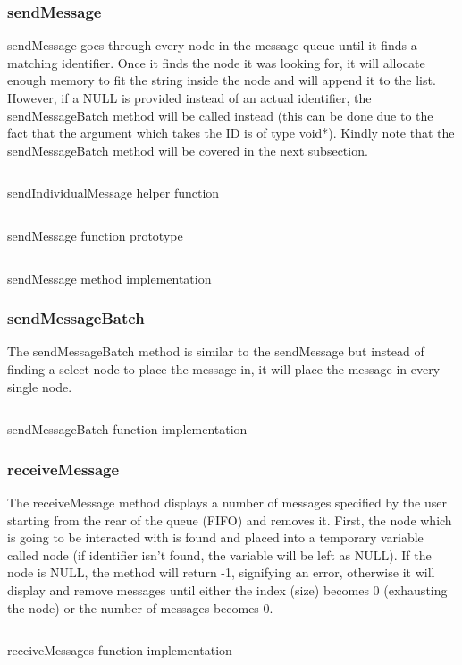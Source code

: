\documentclass[a4paper, 12pt, titlepage]{article}
\newenvironment{code}{\captionsetup{type=listing}}{}
\newcommand{\sourcecode}[3]{
    \begin{code}
      \inputminted[linenos,numbersep=5pt,gobble=0,frame=lines,framesep=2mm,]{c}{#1}
        \caption{#2}
        \label{lst: #3}
    \end{code}
}
\begin{document}
\begin{onehalfspacing}
  \subsubsection{sendMessage}
  sendMessage goes through every node in the message queue until it finds a matching identifier. Once it finds the node it was looking for, it will allocate enough memory to fit the string inside the node and will append it to the list. However, if a NULL is provided instead of an actual identifier, the sendMessageBatch method will be called instead (this can be done due to the fact that the argument which takes the ID is of type void*). Kindly note that the sendMessageBatch method will be covered in the next subsection.

    \sourcecode{snippets/sendIndividual.c}{sendIndividualMessage helper function}{sendInd}

  \sourcecode{snippets/sendMessage_header.c}{sendMessage function prototype}{sendMessage_header}

  \sourcecode{snippets/sendMessage.c}{sendMessage method implementation}{sendMessage}



  \subsubsection{sendMessageBatch}
  The sendMessageBatch method is similar to the sendMessage but instead of finding a select node to place the message in, it will place the message in every single node.

  \sourcecode{snippets/sendMessageBatch.c}{sendMessageBatch function implementation}{sendMessageBatch}


  \subsubsection{receiveMessage}
  The receiveMessage method displays a number of messages specified by the user starting from the rear of the queue (FIFO) and removes it. First, the node which is going to be interacted with is found and placed into a temporary variable called node (if identifier isn't found, the variable will be left as NULL). If the node is NULL, the method will return -1, signifying an error, otherwise it will display and remove messages until either the index (size) becomes 0 (exhausting the node) or the number of messages becomes 0.

  \sourcecode{snippets/receiveMessages.c}{receiveMessages function implementation}{receiveMessages}


\end{onehalfspacing}
\end{document}

